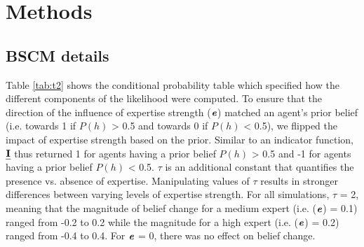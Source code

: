 \documentclass[fleqn,10pt]{wlscirep}
\providecommand{\DIFaddend}{} %
\begin{document}



\DIFaddend \section*{Methods}

\subsection*{BSCM details}

Table \ref{tab:t2} shows the conditional probability table which specified how the different components of the likelihood were computed. To ensure that the direction of the influence of expertise strength (\(\textbf{\textit{e}}\)) matched an agent's prior belief (i.e. towards 1 if \(P(h)\) > 0.5 and towards 0 if  \(P(h)\) < 0.5), we flipped the impact of expertise strength based on the prior. Similar to an indicator function, \(\textbf{\emph{I}}\) thus returned 1 for agents having a prior belief \(P(h)\) > 0.5 and -1 for agents having a prior belief \(P(h)\) < 0.5. \(\tau\) is an additional constant that quantifies the presence vs. absence of expertise. Manipulating values of \(\tau\) results in stronger differences between varying levels of expertise strength. For all simulations, \(\tau\) = 2, meaning that the magnitude of belief change for a medium expert (i.e.  (\(\textbf{\textit{e}}\)) = 0.1) ranged from -0.2 to 0.2 while the magnitude for a high expert (i.e.  (\(\textbf{\textit{e}}\)) = 0.2) ranged from -0.4 to 0.4. For  \(\textbf{\textit{e}}\) = 0, there was no effect on belief change. 
\end{document}
